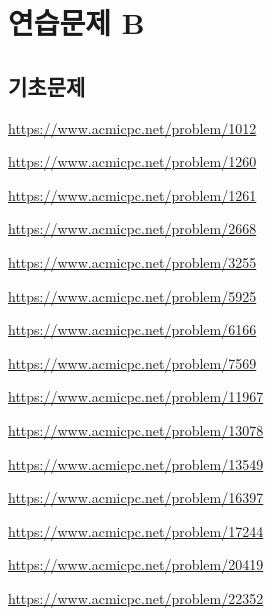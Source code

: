 \section{연습문제 B}

\subsection{기초문제}
\begin{problem} \url{https://www.acmicpc.net/problem/1012} \end{problem}
\begin{problem} \url{https://www.acmicpc.net/problem/1260} \end{problem}
\begin{problem} \url{https://www.acmicpc.net/problem/1261} \end{problem}
\begin{problem} \url{https://www.acmicpc.net/problem/2668} \end{problem}
\begin{problem} \url{https://www.acmicpc.net/problem/3255} \end{problem}
\begin{problem} \url{https://www.acmicpc.net/problem/5925} \end{problem}
\begin{problem} \url{https://www.acmicpc.net/problem/6166} \end{problem}
\begin{problem} \url{https://www.acmicpc.net/problem/7569} \end{problem}
\begin{problem} \url{https://www.acmicpc.net/problem/11967} \end{problem}
\begin{problem} \url{https://www.acmicpc.net/problem/13078} \end{problem}
\begin{problem} \url{https://www.acmicpc.net/problem/13549} \end{problem}
\begin{problem} \url{https://www.acmicpc.net/problem/16397} \end{problem}
\begin{problem} \url{https://www.acmicpc.net/problem/17244} \end{problem}
\begin{problem} \url{https://www.acmicpc.net/problem/20419} \end{problem}
\begin{problem} \url{https://www.acmicpc.net/problem/22352} \end{problem}

